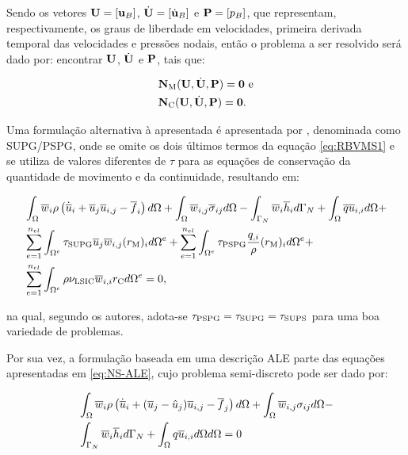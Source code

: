 \documentclass[_ArquivoPrincipal.tex]{subfiles}
\begin{document}
Sendo os vetores $\mathbf{U}=[\mathbf{u}_B]$, $\dot{\mathbf{U}}=[\dot{\mathbf{u}}_B]$ e $\mathbf{P}=[p_B]$, que representam, respectivamente, os graus de liberdade em velocidades, primeira derivada temporal das velocidades e pressões nodais, então o problema a ser resolvido será dado por: encontrar $\mathbf{U}$, $\dot{\mathbf{U}}$ e $\mathbf{P}$, tais que:

\begin{subequations}
    \begin{align}
         & \mathbf{N}_\mathrm{M}(\mathbf{U},\dot{\mathbf{U}},\mathbf{P})=\mathbf{0}\text{ e} \\
         & \mathbf{N}_\mathrm{C}(\mathbf{U},\dot{\mathbf{U}},\mathbf{P})=\mathbf{0}\text{.}
    \end{align}
\end{subequations}

Uma formulação alternativa à apresentada é apresentada por , denominada como SUPG/PSPG, onde se omite os dois últimos termos da equação \ref{eq:RBVMS1} e se utiliza de valores diferentes de $\tau$ para as equações de conservação da quantidade de movimento e da continuidade, resultando em:

\begin{equation}
    \begin{split}
        &\int_{\Omega}{\overline{w}_i\rho\left({\dot{\overline{u}}_i+\overline{u}_j\overline{u}_{i,j}-\overline{f}_i}\right) d\Omega}+\int_{\Omega}{\overline{w}_{i,j}\overline{\sigma}_{ij} d\Omega}-\int_{\Gamma_N}{\overline{w}_i\overline{h}_i d\Gamma_N}+\int_{\Omega}{\overline{q}\overline{u}_{i,i} d\Omega}+\\
        &\sum_{e=1}^{n_{el}}{\int_{\Omega^e}{\tau_{\mathrm{SUPG}}\overline{u}_j\overline{w}_{i,j}(r_\mathrm{M})_{i} d\Omega^e}}+\sum_{e=1}^{n_{el}}{\int_{\Omega^e}{\tau_{\mathrm{PSPG}}\frac{q_{,i}}{\rho}(r_\mathrm{M})_{i} d\Omega^e}}+\\
        &\sum_{e=1}^{n_{el}}{\int_{\Omega^e}{\rho\nu_{\mathrm{LSIC}}\overline{w}_{i,i}r_\mathrm{C} d\Omega^e}}=0
        \text{,}
        \label{eq:SUPG-PSPG}
    \end{split}
\end{equation}

\noindent na qual, segundo os autores, adota-se $\tau_{\mathrm{PSPG}}=\tau_{\mathrm{SUPG}}=\tau_{\mathrm{SUPS}}$ para uma boa variedade de problemas.

Por sua vez, a formulação baseada em uma descrição ALE parte das equações apresentadas em \ref{eq:NS-ALE}, cujo problema semi-discreto pode ser dado por:

\begin{equation}
    \begin{split}
        &\int_{\Omega}{\overline{w}_i\rho\left({\dot{\overline{u}}_i+(\overline{u}_j-\hat{u}_j)\overline{u}_{i,j}-\overline{f}_j}\right) d\Omega}+\int_{\Omega}{\overline{w}_{i,j}\sigma_{ij} d\Omega}-\\
        &\int_{\Gamma_N}{\overline{w}_i\overline{h}_i d\Gamma_N}+\int_{\Omega}{q\overline{u}_{i,i}d\Omega d\Omega}=0
    \end{split}
\end{equation}
\end{document}
